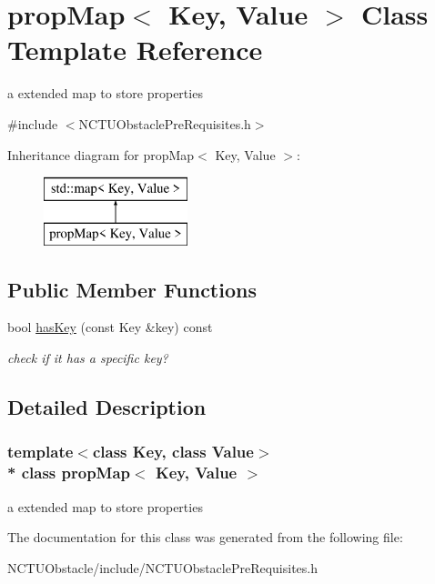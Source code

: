 \hypertarget{classprop_map}{}\section{prop\+Map$<$ Key, Value $>$ Class Template Reference}
\label{classprop_map}


a extended map to store properties  




{\ttfamily \#include $<$N\+C\+T\+U\+Obstacle\+Pre\+Requisites.\+h$>$}

Inheritance diagram for prop\+Map$<$ Key, Value $>$\+:\begin{figure}[H]
\begin{center}
\leavevmode
\includegraphics[height=2.000000cm]{classprop_map}
\end{center}
\end{figure}
\subsection*{Public Member Functions}
\begin{DoxyCompactItemize}
\item 
bool \hyperlink{classprop_map_af9969258e92cd7a55002131e2823f5a6}{has\+Key} (const Key \&key) const \hypertarget{classprop_map_af9969258e92cd7a55002131e2823f5a6}{}\label{classprop_map_af9969258e92cd7a55002131e2823f5a6}

\begin{DoxyCompactList}\small\item\em check if it has a specific key? \end{DoxyCompactList}\end{DoxyCompactItemize}


\subsection{Detailed Description}
\subsubsection*{template$<$class Key, class Value$>$\\*
class prop\+Map$<$ Key, Value $>$}

a extended map to store properties 

The documentation for this class was generated from the following file\+:\begin{DoxyCompactItemize}
\item 
N\+C\+T\+U\+Obstacle/include/N\+C\+T\+U\+Obstacle\+Pre\+Requisites.\+h\end{DoxyCompactItemize}
